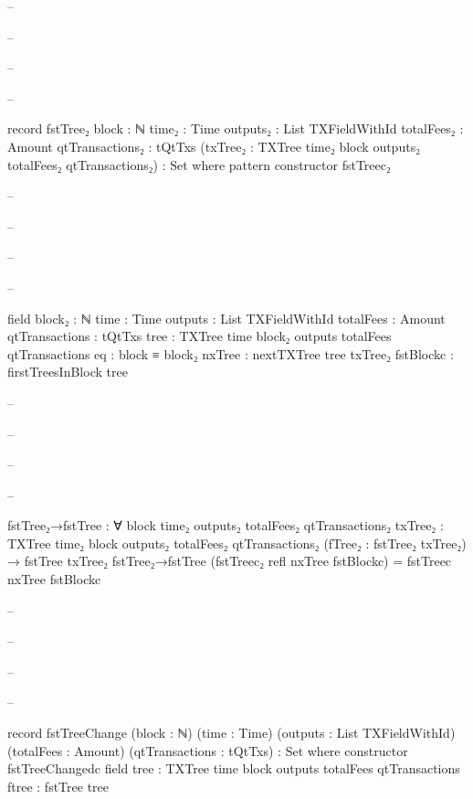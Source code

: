 \documentclass{beamer}
\begin{document}
{\begin{frame}
\begin{code}
-- \end{code}
-- \end{frame}
-- \begin{frame}
-- \begin{code}

      record fstTree₂
        {block : ℕ}
        {time₂ : Time}
        {outputs₂ : List TXFieldWithId}
        {totalFees₂ : Amount}
        {qtTransactions₂ : tQtTxs}
        (txTree₂ : TXTree time₂ block outputs₂ totalFees₂
          qtTransactions₂)
        : Set where
        pattern
        constructor fstTreec₂

-- \end{code}
-- \end{frame}
-- \begin{frame}
-- \begin{code}

        field
          {block₂}              : ℕ
          {time}               : Time
          {outputs}            : List TXFieldWithId
          {totalFees}          : Amount
          {qtTransactions}     : tQtTxs
          {tree}               : TXTree time block₂
            outputs totalFees qtTransactions
          eq                   : block ≡ block₂
          nxTree               : nextTXTree tree txTree₂
          fstBlockc            : firstTreesInBlock tree

-- \end{code}
-- \end{frame}
-- \begin{frame}
-- \begin{code}

      fstTree₂→fstTree : ∀
        {block time₂ outputs₂ totalFees₂ qtTransactions₂}
        {txTree₂ : TXTree time₂ block outputs₂ totalFees₂
          qtTransactions₂}
        (fTree₂ : fstTree₂ txTree₂)
        → fstTree txTree₂
      fstTree₂→fstTree (fstTreec₂ refl nxTree fstBlockc)
        = fstTreec nxTree fstBlockc

-- \end{code}
-- \end{frame}
-- \begin{frame}
-- \begin{code}

      record fstTreeChange
        (block : ℕ)
        (time : Time)
        (outputs : List TXFieldWithId)
        (totalFees : Amount)
        (qtTransactions : tQtTxs)
        : Set where
        constructor fstTreeChangedc
        field
          {tree}      : TXTree time block outputs
            totalFees qtTransactions
          ftree       : fstTree tree


\end{code}
\end{frame}}
\end{document}
